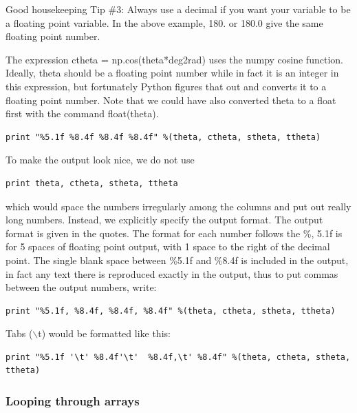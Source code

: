 \documentclass[11pt]{book}
\begin{document}
{{{{{\color{magenta}Good housekeeping Tip \#3:  Always use a decimal if you want your variable to be a floating point variable. In the above example, 180. or 180.0 give the same floating point number.}

The expression {\color{blue} ctheta = np.cos(theta*deg2rad)} uses the {\color{blue}numpy} cosine function. Ideally, {\color{blue} theta} should be a floating point number while in fact it is an integer in this expression, but fortunately Python figures that out and converts it to a floating point number.   Note that we could have also converted theta to a float first with the command {\color{blue}float(theta)}.

{ \color{blue} \begin{verbatim}
print "%5.1f %8.4f %8.4f %8.4f" %(theta, ctheta, stheta, ttheta)
\end{verbatim}}

\noindent To make the output look nice, we do not use

{ \color{blue} \begin{verbatim}
print theta, ctheta, stheta, ttheta
\end{verbatim}}

\noindent which would space the numbers irregularly among the columns and put out really long numbers.  Instead,
we explicitly specify the output format.   The output format is given in the quotes.  The format for each
number follows the \%, 5.1f is for 5 spaces of floating point output, with 1
space to the right of the decimal point.  The single
blank space between \%5.1f and \%8.4f is included in the output, in fact any
text there is reproduced exactly in the output, thus to put commas between
the output numbers, write:

{ \color{blue} \begin{verbatim}
print "%5.1f, %8.4f, %8.4f, %8.4f" %(theta, ctheta, stheta, ttheta)
\end{verbatim}}

\noindent Tabs ($\backslash$t) would be formatted like this:

{ \color{blue} \begin{verbatim}
print "%5.1f '\t' %8.4f'\t'  %8.4f,\t' %8.4f" %(theta, ctheta, stheta, ttheta)
\end{verbatim}  }

 \subsubsection{Looping through arrays}

}}}}
\end{document}
